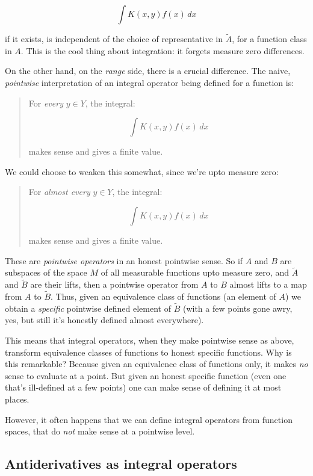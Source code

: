 \documentclass[a4paper]{amsart}
\begin{document}
$$\int K(x,y) f(x) \, dx$$

if it exists, is independent of the choice of representative in
$\tilde{A}$, for a function class in $A$. This is the cool thing about
integration: it forgets measure zero differences.

On the other hand, on the {\em range} side, there is a crucial
difference. The naive, {\em pointwise} interpretation of an integral
operator being defined for a function is:

\begin{quote}
  For {\em every} $y \in Y$, the integral:

  $$\int K(x,y) f(x) \, dx$$

  makes sense and gives a finite value.
\end{quote}

We could choose to weaken this somewhat, since we're upto measure
zero:

\begin{quote}
  For {\em almost every} $y \in Y$, the integral:

  $$\int K(x,y) f(x) \, dx$$

  makes sense and gives a finite value.
\end{quote}

These are {\em pointwise operators} in an honest pointwise sense. So
if $A$ and $B$ are subspaces of the space $M$ of all measurable
functions upto measure zero, and $\tilde{A}$ and $\tilde{B}$ are their
lifts, then a pointwise operator from $A$ to $B$ almost lifts to a map
from $A$ to $\tilde{B}$. Thus, given an equivalence class of functions
(an element of $A$) we obtain a {\em specific} pointwise defined
element of $\tilde{B}$ (with a few points gone awry, yes, but still
it's honestly defined almost everywhere).

This means that integral operators, when they make pointwise sense as
above, transform equivalence classes of functions to honest specific
functions. Why is this remarkable? Because given an equivalence class
of functions only, it makes {\em no} sense to evaluate at a point. But
given an honest specific function (even one that's ill-defined at a
few points) one can make sense of defining it at most places.

However, it often happens that we can define integral operators from
function spaces, that do {\em not} make sense at a pointwise level.

\subsection{Antiderivatives as integral operators}
\end{document}
